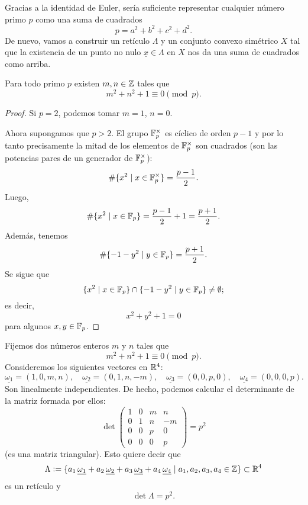 \documentclass{article}
\numberwithin{equation}{section}
\begin{document}
Gracias a la identidad de Euler, sería suficiente representar cualquier número
primo $p$ como una suma de cuadrados
$$p = a^2 + b^2 + c^2 + d^2.$$
De nuevo, vamos a construir un retículo $\Lambda$ y un conjunto convexo
simétrico $X$ tal que la existencia de un punto no nulo
$\underline{x}\in \Lambda$ en $X$ nos da una suma de cuadrados como arriba.

\begin{lema}
  Para todo primo $p$ existen $m,n\in\mathbb{Z}$ tales que
  $$m^2 + n^2 + 1 \equiv 0 \pmod{p}.$$

  \begin{proof}
    Si $p = 2$, podemos tomar $m = 1$, $n = 0$.

    Ahora supongamos que $p > 2$. El grupo $\mathbb{F}_p^\times$ es cíclico de orden
    $p-1$ y por lo tanto precisamente la mitad de los elementos de
    $\mathbb{F}_p^\times$ son cuadrados (son las potencias pares de un generador de
    $\mathbb{F}_p^\times$):
    $$\# \{ x^2 \mid x \in \mathbb{F}_p^\times \} = \frac{p-1}{2}.$$
    Luego,
    $$\# \{ x^2 \mid x \in \mathbb{F}_p \} = \frac{p-1}{2} + 1 = \frac{p+1}{2}.$$
    Además, tenemos
    $$\# \{ -1 - y^2 \mid y \in \mathbb{F}_p \} = \frac{p+1}{2}.$$
    Se sigue que
    $$\{ x^2 \mid x \in \mathbb{F}_p \} \cap \{ -1 - y^2 \mid y \in \mathbb{F}_p \} \ne \emptyset;$$
    es decir,
    $$x^2 + y^2 + 1 = 0$$
    para algunos $x, y\in \mathbb{F}_p$.
  \end{proof}
\end{lema}

Fijemos dos números enteros $m$ y $n$ tales que
$$m^2 + n^2 + 1 \equiv 0 \pmod{p}.$$
Consideremos los siguientes vectores en $\mathbb{R}^4$:
\[ \underline{\omega_1} = (1,0,m,n), \quad
\underline{\omega_2} = (0,1,n,-m), \quad
\underline{\omega_3} = (0,0,p,0), \quad
\underline{\omega_4} = (0,0,0,p). \]
Son linealmente independientes. De hecho, podemos calcular el determinante de la
matriz formada por ellos:
$$\det \begin{pmatrix}
1 & 0 & m & n\\
0 & 1 & n & -m\\
0 & 0 & p & 0\\
0 & 0 & 0 & p
\end{pmatrix} = p^2$$
(es una matriz triangular). Esto quiere decir que
$$\Lambda \mathrel{\mathop:}= \{ a_1\,\underline{\omega_1} + a_2\,\underline{\omega_2} + a_3\,\underline{\omega_3} + a_4\,\underline{\omega_4} \mid a_1,a_2,a_3,a_4 \in \mathbb{Z} \} \subset \mathbb{R}^4$$
es un retículo y
$$\det \Lambda = p^2.$$
\end{document}
